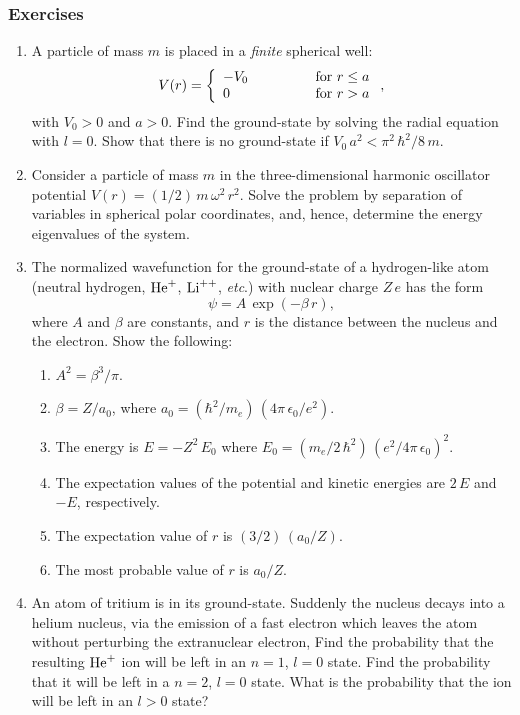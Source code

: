 \subsubsection*{Exercises}
{\small
\begin{enumerate}

\item A particle of mass $m$ is placed in a {\em finite}\/ spherical
well:
$$
V(r) = \left\{
\begin{array}{lcl}
-V_0&\mbox{\hspace{1cm}}&\mbox{for $r\leq a$}\\
0&&\mbox{for $r>a$}
\end{array}
\right. ,
$$
with $V_0>0$ and $a>0$.
Find the ground-state by solving the radial equation with $l=0$. 
Show that there is no ground-state if $V_0\,a^2< \pi^2\,\hbar^2/8\,m$.


\item Consider a particle of mass $m$ in the three-dimensional harmonic oscillator potential
$V(r)=(1/2)\,m\,\omega^2\,r^2$. Solve the problem by separation of
variables in spherical polar coordinates, and, hence, determine the
 energy eigenvalues of the system.  

\item The normalized wavefunction for the ground-state of a hydrogen-like
atom (neutral hydrogen, ${\rm He}^+$, ${\rm Li}^{++}$, {\em etc}.) with
nuclear charge $Z\,e$ has the form
$$
\psi = A\,\exp(-\beta\,r),
$$
where $A$ and $\beta$ are constants, and $r$ is the distance between the
nucleus and the electron. Show the following:
\begin{enumerate}
\item $A^2=\beta^3/\pi$.
\item $\beta = Z/a_0$, where $a_0=(\hbar^2/m_e)\,(4\pi\,\epsilon_0/e^2)$.
\item The energy is $E=-Z^2\,E_0$ where $E_0 = (m_e/2\,\hbar^2)\,(e^2/4\pi\,\epsilon_0)^2$.
\item The expectation values of the potential and kinetic energies are
$2\,E$ and $-E$, respectively.
\item The expectation value of $r$ is $(3/2)\,(a_0/Z)$.
\item The most probable value of $r$ is $a_0/Z$.
\end{enumerate}


\item An atom of tritium is in its ground-state.  Suddenly the nucleus
decays into a helium nucleus, via the emission of a fast electron
which leaves the atom without perturbing the extranuclear electron,
Find the probability that the resulting ${\rm He}^+$ ion will be
left in an $n=1$, $l=0$ state. Find the probability that it will
be left  in a $n=2$, $l=0$ state. What is the probability that the
ion will be left in an $l>0$ state? 


\end{enumerate}}
